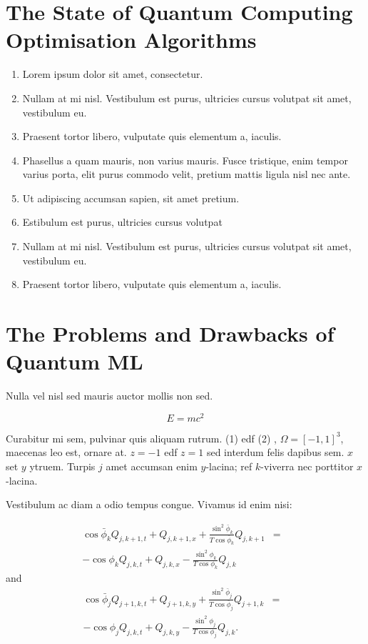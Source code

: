 \documentclass[a0,portrait]{a0poster}
\begin{document}
\begin{multicols}{2}
\section*{The State of Quantum Computing Optimisation  Algorithms}%

\begin{enumerate}
\item Lorem ipsum dolor sit amet, consectetur.
\item Nullam at mi nisl. Vestibulum est purus, ultricies cursus volutpat sit amet, vestibulum eu.
\item Praesent tortor libero, vulputate quis elementum a, iaculis.
\item Phasellus a quam mauris, non varius mauris. Fusce tristique, enim tempor varius porta, elit purus commodo velit, pretium mattis ligula nisl nec ante.
\item Ut adipiscing accumsan sapien, sit amet pretium.
\item Estibulum est purus, ultricies cursus volutpat
\item Nullam at mi nisl. Vestibulum est purus, ultricies cursus volutpat sit amet, vestibulum eu.
\item Praesent tortor libero, vulputate quis elementum a, iaculis.
\end{enumerate}

\section*{The Problems and Drawbacks of Quantum ML}
Nulla vel nisl sed mauris auctor mollis non sed. 

\begin{equation}
E = mc^{2}
\label{eqn:Einstein}
\end{equation}

Curabitur mi sem, pulvinar quis aliquam rutrum. (1) edf (2)
, $\Omega=[-1,1]^3$, maecenas leo est, ornare at. $z=-1$ edf $z=1$ sed interdum felis dapibus sem. $x$ set $y$ ytruem. 
Turpis $j$ amet accumsan enim $y$-lacina; 
ref $k$-viverra nec porttitor $x$-lacina. 

Vestibulum ac diam a odio tempus congue. Vivamus id enim nisi:

\begin{eqnarray}
\cos\bar{\phi}_k Q_{j,k+1,t} + Q_{j,k+1,x}+\frac{\sin^2\bar{\phi}_k}{T\cos\bar{\phi}_k} Q_{j,k+1} &=&\nonumber\\ 
-\cos\phi_k Q_{j,k,t} + Q_{j,k,x}-\frac{\sin^2\phi_k}{T\cos\phi_k} Q_{j,k}\label{edgek}
\end{eqnarray}
and
\begin{eqnarray}
\cos\bar{\phi}_j Q_{j+1,k,t} + Q_{j+1,k,y}+\frac{\sin^2\bar{\phi}_j}{T\cos\bar{\phi}_j} Q_{j+1,k}&=&\nonumber \\
-\cos\phi_j Q_{j,k,t} + Q_{j,k,y}-\frac{\sin^2\phi_j}{T\cos\phi_j} Q_{j,k}.\label{edgej}
\end{eqnarray} 


\end{multicols}
\end{document}
